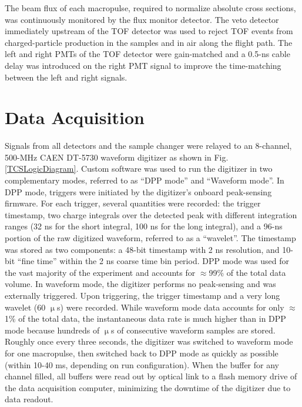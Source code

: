 The beam flux of each macropulse, required to normalize absolute cross sections, was continuously
monitored by the flux monitor detector. The veto detector immediately upstream
of the TOF detector was used to reject TOF events from
charged-particle production in the samples and in air along the flight path. The
left and right PMTs of the TOF detector were gain-matched and a
0.5-ns cable delay was introduced on the right PMT signal to improve the
time-matching between the left and right signals.

\section{Data Acquisition} \label{DataAcquisition}
Signals from all detectors and the sample changer were relayed to an 8-channel, 500-MHz CAEN 
DT-5730
waveform digitizer as shown in Fig. \ref{TCSLogicDiagram}. Custom software was used to run the 
digitizer in two complementary modes, referred to as ``DPP mode'' and ``Waveform 
mode''. In DPP mode, triggers were initiated by the digitizer's onboard
peak-sensing firmware. For each trigger, several quantities were recorded: the trigger 
timestamp, two charge integrals over the detected peak with different
integration ranges (32 ns for the short integral, 100 ns for the long integral),
and a 96-ns portion of the raw digitized waveform, referred to as a ``wavelet''.
The timestamp was stored as two components: a 48-bit timestamp with 2 ns
resolution, and 10-bit ``fine time'' within the 2 ns coarse time bin period.
DPP mode was used for the vast majority of the 
experiment and accounts for $\approx$99\% of the total data volume. In waveform mode, 
the digitizer performs no peak-sensing and was externally triggered. Upon 
triggering, the trigger timestamp and a very long wavelet (60 $\upmu$s) 
were recorded. While waveform mode data accounts for only $\approx$1\% of the total data, 
the instantaneous data rate is much higher than in DPP 
mode because hundreds of $\upmu$s of consecutive waveform samples are 
stored. Roughly once every three seconds, the digitizer was switched to 
waveform mode for one macropulse, then switched back to DPP mode as quickly as
possible (within 10-40 ms, depending on run configuration). When the buffer for
any channel filled, all buffers were read out by optical link to a flash memory
drive of the data acquisition computer, minimizing the downtime of the digitizer
due to data readout.

